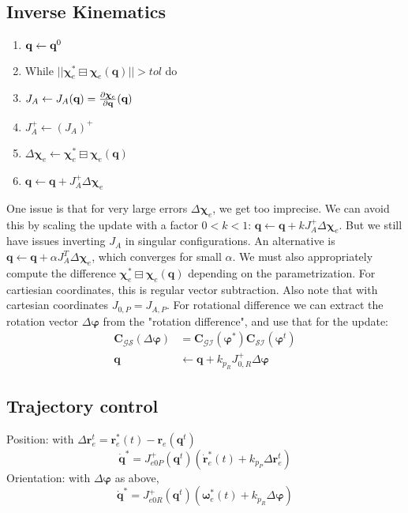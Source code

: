 \documentclass[a4paper, 8pt]{extarticle}
\newcommand{\mrot}[2]{ \textbf{#1}_{ \mathcal{#2} } }
\begin{document}
\begin{multicols*}{3}
\subsection{Inverse Kinematics}
\begin{enumerate}
\item $\mathbf q \leftarrow \textbf q^0$
\item While $||\bm\chi_e^* \boxminus \bm\chi_e(\mathbf q)|| > tol$ do
\item \hspace{1em} $J_A \leftarrow J_A(\textbf q) = \frac{\partial \bm\chi_e}{\partial \textbf q}(\textbf q)$
\item \hspace{1em} $J_A^+ \leftarrow (J_A)^+$
\item \hspace{1em} $\Delta\bm\chi_e \leftarrow \bm\chi_e^* \boxminus \bm\chi_e(\mathbf q)$
\item \hspace{1em} $\mathbf q \leftarrow \mathbf q + J_A^+\Delta\bm\chi_e$
\end{enumerate}
One issue is that for very large errors $\Delta\bm\chi_e$, we get too imprecise. We can avoid this by scaling the update with a factor $0 < k < 1$: $\mathbf q \leftarrow \mathbf q + kJ_A^+\Delta\bm\chi_e$. But we still have issues inverting $J_A$ in singular configurations. An alternative is $\mathbf q \leftarrow \mathbf q + \alpha J_A^T\Delta\bm\chi_e$, which converges for small $\alpha$.
We must also appropriately compute the difference $\bm\chi_e^* \boxminus \bm\chi_e(\mathbf q)$ depending on the parametrization. For cartiesian coordinates, this is regular vector subtraction. Also note that with cartesian coordinates $J_{0,P} = J_{A,P}$. For rotational difference we can extract the rotation vector $\Delta\bm\varphi$ from the "rotation difference", and use that for the update:
\begin{align*}
\mrot{C}{GS}(\Delta\bm\varphi) &= \mrot{C}{GI}(\bm\varphi^*)\mrot{C}{SI}(\bm\varphi^t)\\
\mathbf q &\leftarrow \mathbf q + k_{p_R}J_{0,R}^+\Delta\bm\varphi
\end{align*}



\subsection{Trajectory control}
Position: with $\Delta\mathbf r^t_e = \mathbf r^*_e(t) - \mathbf r_e(\mathbf q^t)$
$$\dot{\mathbf q}^* = J_{e0P}^+(\mathbf q^t) (\dot{\mathbf r}^*_e(t) + k_{p_P}\Delta\mathbf r^t_e)$$
Orientation: with $\Delta\bm\varphi$ as above,
$$\dot{\mathbf q}^* = J_{e0R}^+(\mathbf q^t) (\bm\omega^*_e(t) + k_{p_R}\Delta\bm\varphi)$$







\end{multicols*}
\end{document}
